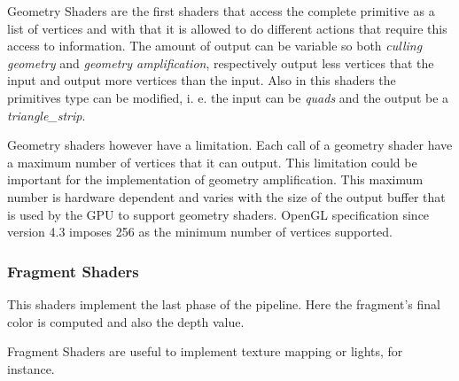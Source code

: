 Geometry Shaders are the first shaders that access the complete primitive as a list of vertices and with that it is allowed to do different actions that require this access to information. The amount of output can be variable so both \emph{culling geometry} and \emph{geometry amplification}, respectively output less vertices that the input and output more vertices than the input. Also in this shaders the primitives type can be modified, i. e. the input can be \emph{quads} and the output be a \emph{triangle\_strip}.

Geometry shaders however have a limitation. Each call of a geometry shader have a maximum number of vertices that it can output. This limitation could be important for the implementation of geometry amplification. This maximum number is hardware dependent and varies with the size of the output buffer that is used by the GPU to support geometry shaders. OpenGL specification since version 4.3 imposes 256 as the minimum number of vertices supported.


\subsubsection{Fragment Shaders} %
\label{sub:fragment_shaders}
This shaders implement the last phase of the pipeline. Here the fragment's final color is computed and also the depth value.

Fragment Shaders are useful to implement texture mapping or lights, for instance.


